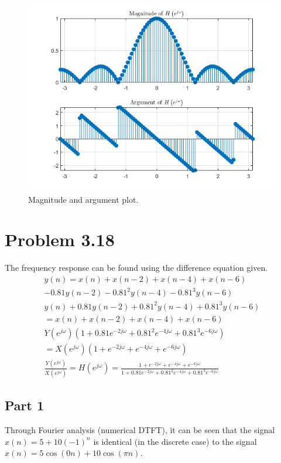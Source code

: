 \documentclass{article}
\begin{document}
\begin{figure}[H]
    \centering
    \includegraphics[width=\textwidth]{"Images/3-17 Part 4"}
    \caption{Magnitude and argument plot.}
    \label{plot:3.17.4}
\end{figure}

\section*{Problem 3.18}
The frequency response can be found using the difference
equation given.
\begin{gather*}
    y(n) = x(n) + x(n - 2) + x(n - 4) + x(n - 6)\\ - 0.81y(n - 2) - 0.81^2 y(n - 4) - 0.81^3 y(n-6)\\
    y(n) + 0.81y(n - 2) + 0.81^2 y(n - 4) + 0.81^3 y(n-6)\\ =
    x(n) + x(n - 2) + x(n - 4) + x(n - 6)\\
    Y\left( e^{j\omega} \right)\left(1  + 0.81e^{-2j\omega} + 0.81^2e^{-4j\omega} + 0.81^3 e^{-6j\omega} \right)\\
    = X\left( e^{j\omega} \right) \left( 1 + e^{-2j\omega} + e^{-4j\omega} + e^{-6j\omega} \right)\\
    \frac{Y\left( e^{j\omega} \right)}{X\left( e^{j\omega} \right)} = H\left( e^{j\omega} \right) = \frac{1 + e^{-2j\omega} + e^{-4j\omega} + e^{-6j\omega}}{1  + 0.81e^{-2j\omega} + 0.81^2e^{-4j\omega} + 0.81^3 e^{-6j\omega}}
\end{gather*}

\subsection*{Part 1}
Through Fourier analysis (numerical DTFT), it can be seen that
the signal \(x(n) = 5 + 10(-1)^n\) is identical (in the discrete
case) to the signal \(x(n) = 5\cos(0n) + 10\cos(\pi n)\).
\end{document}
